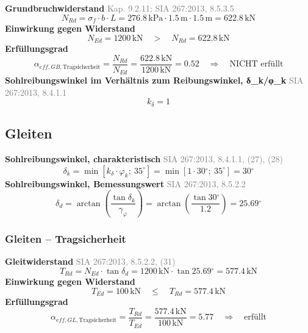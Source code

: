 \documentclass[11pt,a4paper]{article}
\newcommand{\normref}[1]{{\small\textcolor{gray}{#1}}}
\begin{document}
\noindent\textbf{Grundbruchwiderstand} \hfill \normref{Kap. 9.2.11; SIA 267:2013, 8.5.3.5}
\begin{equation*}
N_{Rd} = \sigma_f \cdot b \cdot L = 276.8\,\mathrm{kPa} \cdot 1.5\,\mathrm{m} \cdot 1.5\,\mathrm{m} = 622.8\,\mathrm{kN}
\end{equation*}
\noindent\textbf{Einwirkung gegen Widerstand}
\begin{equation*}
N_{Ed} = 1200\,\mathrm{kN} \quad > \quad N_{Rd} = 622.8\,\mathrm{kN}
\end{equation*}
\noindent\textbf{Erfüllungsgrad}
\begin{equation*}
\alpha_{eff,GB,\text{Tragsicherheit}} = \frac{N_{Rd}}{N_{Ed}} = \frac{622.8\,\mathrm{kN}}{1200\,\mathrm{kN}} = 0.52 \quad \Rightarrow \quad \text{NICHT erfüllt}
\end{equation*}
\noindent\textbf{Sohlreibungswinkel im Verhältnis zum Reibungswinkel, δ\_k/φ\_k} \hfill \normref{SIA 267:2013, 8.4.1.1}
\begin{equation*}
k_{\delta} = 1
\end{equation*}
\subsection{Gleiten}
\noindent\textbf{Sohlreibungswinkel, charakteristisch} \hfill \normref{SIA 267:2013, 8.4.1.1, (27), (28)}
\begin{equation*}
\delta_k = \min\left[k_{\delta} \cdot \varphi_k;\ 35^\circ\right] = \min\left[1 \cdot 30{}^{\circ};\ 35^\circ\right] = 30{}^{\circ}
\end{equation*}
\noindent\textbf{Sohlreibungswinkel, Bemessungswert} \hfill \normref{SIA 267:2013, 8.5.2.2}
\begin{equation*}
\delta_d = \arctan\left(\frac{\tan \delta_k}{\gamma_{\varphi}}\right) = \arctan\left(\frac{\tan 30{}^{\circ}}{1.2}\right) = 25.69{}^{\circ}
\end{equation*}
\subsubsection{Gleiten – Tragsicherheit}
\noindent\textbf{Gleitwiderstand} \hfill \normref{SIA 267:2013, 8.5.2.2, (31)}
\begin{equation*}
T_{Rd} = N_{Ed} \cdot \tan \delta_d = 1200\,\mathrm{kN} \cdot \tan 25.69{}^{\circ} = 577.4\,\mathrm{kN}
\end{equation*}
\noindent\textbf{Einwirkung gegen Widerstand}
\begin{equation*}
T_{Ed} = 100\,\mathrm{kN} \quad \le \quad T_{Rd} = 577.4\,\mathrm{kN}
\end{equation*}
\noindent\textbf{Erfüllungsgrad}
\begin{equation*}
\alpha_{eff,GL,\text{Tragsicherheit}} = \frac{T_{Rd}}{T_{Ed}} = \frac{577.4\,\mathrm{kN}}{100\,\mathrm{kN}} = 5.77 \quad \Rightarrow \quad \text{erfüllt}
\end{equation*}
\end{document}
